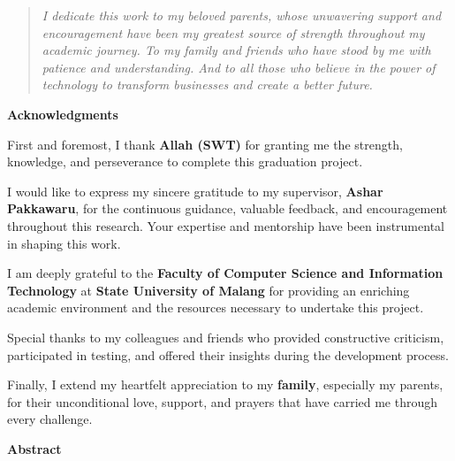 \documentclass[12pt,a4paper]{report}
\begin{document}
\begin{quote}
\large
\textit{I dedicate this work to my beloved parents, whose unwavering support and encouragement have been my greatest source of strength throughout my academic journey. To my family and friends who have stood by me with patience and understanding. And to all those who believe in the power of technology to transform businesses and create a better future.}
\end{quote}
\newpage

\newpage
\thispagestyle{empty}
\vspace*{2cm}
\begin{center}
{\LARGE\textbf{Acknowledgments}}\\[1.5cm]
\end{center}

First and foremost, I thank \textbf{Allah (SWT)} for granting me the strength, knowledge, and perseverance to complete this graduation project.

I would like to express my sincere gratitude to my supervisor, \textbf{Ashar Pakkawaru}, for the continuous guidance, valuable feedback, and encouragement throughout this research. Your expertise and mentorship have been instrumental in shaping this work.

I am deeply grateful to the \textbf{Faculty of Computer Science and Information Technology} at \textbf{State University of Malang} for providing an enriching academic environment and the resources necessary to undertake this project.

Special thanks to my colleagues and friends who provided constructive criticism, participated in testing, and offered their insights during the development process.

Finally, I extend my heartfelt appreciation to my \textbf{family}, especially my parents, for their unconditional love, support, and prayers that have carried me through every challenge.

\newpage

\newpage
\thispagestyle{empty}
\vspace*{2cm}
\begin{center}
{\LARGE\textbf{Abstract}}\\[1.5cm]
\end{center}
\end{document}
